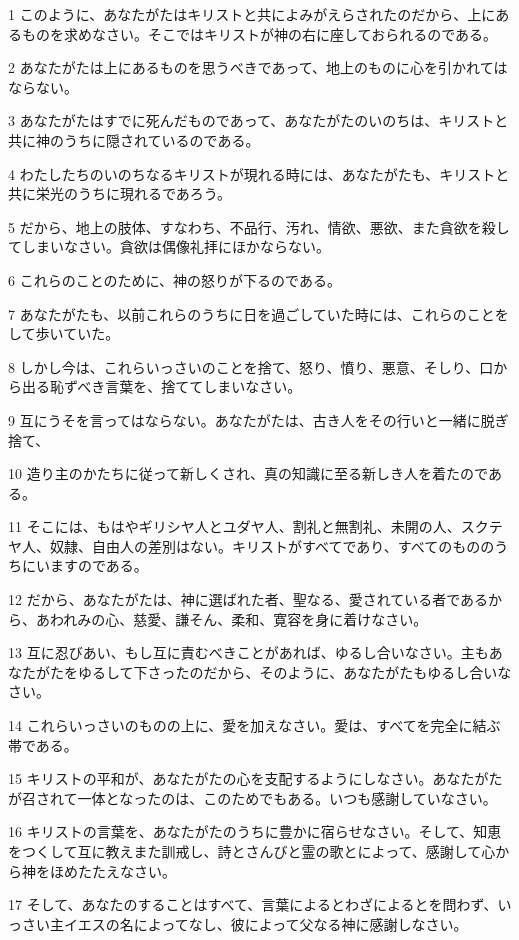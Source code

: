 \par 1 このように、あなたがたはキリストと共によみがえらされたのだから、上にあるものを求めなさい。そこではキリストが神の右に座しておられるのである。
\par 2 あなたがたは上にあるものを思うべきであって、地上のものに心を引かれてはならない。
\par 3 あなたがたはすでに死んだものであって、あなたがたのいのちは、キリストと共に神のうちに隠されているのである。
\par 4 わたしたちのいのちなるキリストが現れる時には、あなたがたも、キリストと共に栄光のうちに現れるであろう。
\par 5 だから、地上の肢体、すなわち、不品行、汚れ、情欲、悪欲、また貪欲を殺してしまいなさい。貪欲は偶像礼拝にほかならない。
\par 6 これらのことのために、神の怒りが下るのである。
\par 7 あなたがたも、以前これらのうちに日を過ごしていた時には、これらのことをして歩いていた。
\par 8 しかし今は、これらいっさいのことを捨て、怒り、憤り、悪意、そしり、口から出る恥ずべき言葉を、捨ててしまいなさい。
\par 9 互にうそを言ってはならない。あなたがたは、古き人をその行いと一緒に脱ぎ捨て、
\par 10 造り主のかたちに従って新しくされ、真の知識に至る新しき人を着たのである。
\par 11 そこには、もはやギリシヤ人とユダヤ人、割礼と無割礼、未開の人、スクテヤ人、奴隷、自由人の差別はない。キリストがすべてであり、すべてのもののうちにいますのである。
\par 12 だから、あなたがたは、神に選ばれた者、聖なる、愛されている者であるから、あわれみの心、慈愛、謙そん、柔和、寛容を身に着けなさい。
\par 13 互に忍びあい、もし互に責むべきことがあれば、ゆるし合いなさい。主もあなたがたをゆるして下さったのだから、そのように、あなたがたもゆるし合いなさい。
\par 14 これらいっさいのものの上に、愛を加えなさい。愛は、すべてを完全に結ぶ帯である。
\par 15 キリストの平和が、あなたがたの心を支配するようにしなさい。あなたがたが召されて一体となったのは、このためでもある。いつも感謝していなさい。
\par 16 キリストの言葉を、あなたがたのうちに豊かに宿らせなさい。そして、知恵をつくして互に教えまた訓戒し、詩とさんびと霊の歌とによって、感謝して心から神をほめたたえなさい。
\par 17 そして、あなたのすることはすべて、言葉によるとわざによるとを問わず、いっさい主イエスの名によってなし、彼によって父なる神に感謝しなさい。
